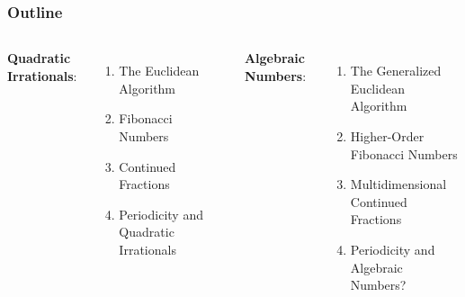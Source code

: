 \documentclass[aspectratio=169]{beamer}
\begin{document}
\begin{frame}
  \frametitle{Outline}
  \small
  \begin{columns}
    \textbf{Quadratic Irrationals}:
    \begin{enumerate}
      \item The Euclidean Algorithm
      \item Fibonacci Numbers
      \item Continued Fractions
      \item Periodicity and Quadratic Irrationals
    \end{enumerate}

    \textbf{Algebraic Numbers}:
    \begin{enumerate}
      \item The Generalized Euclidean Algorithm
      \item Higher-Order Fibonacci Numbers
      \item Multidimensional Continued Fractions
      \item Periodicity and Algebraic Numbers?
    \end{enumerate}
  \end{columns}
\end{frame}
\end{document}
